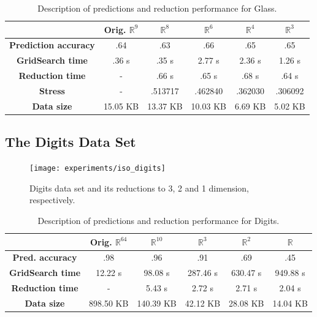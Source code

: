 \begin{table}[H]
	\centering
	\begin{tabular}{|c|c|c|c|c|c|}
		\hline
		& \textbf{Orig. $\mathbb{R}^{9}$} & \textbf{$\mathbb{R}^8$} & \textbf{$\mathbb{R}^6$} & \textbf{$\mathbb{R}^4$}  & \textbf{$\mathbb{R}^3$} \\\hline
		\textbf{Prediction accuracy}   & .64 & .63  & .66 & .65  & .65 \\\hline
		\textbf{GridSearch time} & .36 s & .35 s   & 2.77 s & 2.36 s & 1.26 s  \\\hline
		\textbf{Reduction time}  & -  & .66 s & .65 s & .68 s    & .64 s     \\\hline
		\textbf{Stress} & - & .513717 & .462840 & .362030 & .306092 \\\hline
		\textbf{Data size}          & 15.05 KB & 13.37 KB & 10.03 KB & 6.69 KB & 5.02 KB   \\\hline
	\end{tabular}
	
	\caption{Description of predictions and reduction performance for Glass.}
\end{table}

\newpage
\subsection{The Digits Data Set}

\begin{figure}[H]
	\centering
	\texttt{[image: experiments/iso\_digits]}
	\captionsetup{justification=centering}
	\caption{Digits data set and its reductions to 3, 2 and 1 dimension, respectively.}
	\label{fig:dsdigitsiso}
\end{figure}

\begin{table}[H]
	\centering
	\begin{tabular}{|c|c|c|c|c|c|}
		\hline
		& \textbf{Orig. $\mathbb{R}^{64}$} & \textbf{$\mathbb{R}^{10}$} & \textbf{$\mathbb{R}^3$} & \textbf{$\mathbb{R}^2$} & \textbf{$\mathbb{R}$} \\\hline
		\textbf{Pred. accuracy}   & .98 & .96 & .91 & .69 & .45 \\\hline
		\textbf{GridSearch time} & 12.22 s & 98.08 s & 287.46 s & 630.47 s & 949.88 s \\\hline
		\textbf{Reduction time}  & - & 5.43 s & 2.72 s & 2.71 s & 2.04 s \\\hline
		\textbf{Data size} & 898.50 KB & 140.39 KB & 42.12 KB & 28.08 KB & 14.04 KB \\\hline
	\end{tabular}
	
	\caption{Description of predictions and reduction performance for Digits.}
\end{table}

